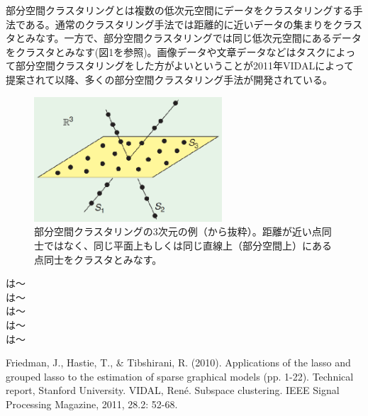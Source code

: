 部分空間クラスタリングとは複数の低次元空間にデータをクラスタリングする手法である。通常のクラスタリング手法では距離的に近いデータの集まりをクラスタとみなす。一方で、部分空間クラスタリングでは同じ低次元空間にあるデータをクラスタとみなす(図1を参照)。画像データや文章データなどはタスクによって部分空間クラスタリングをした方がよいということが2011年VIDAL\cite{SC}によって提案されて以降、多くの部分空間クラスタリング手法が開発されている。

\begin{figure}[h]
    \centering
    \includegraphics[width=7cm]{Matsushima/sc.eps}
    \caption{部分空間クラスタリングの3次元の例（\cite{SC}から抜粋）。距離が近い点同士ではなく、同じ平面上もしくは同じ直線上（部分空間上）にある点同士をクラスタとみなす。}
    \label{fig:my_label}
\end{figure}
\cite{HSM01}は〜\\
\cite{HSM02}は〜\\
\cite{KM01}は〜\\
\cite{KM02}は〜\\
\cite{NM01}は〜

\begin{thebibliography}{9}
    Friedman, J., Hastie, T., & Tibshirani, R. (2010). 
    Applications of the lasso and grouped lasso to the estimation of sparse graphical models (pp. 1-22). Technical report, Stanford University.
 VIDAL, René. Subspace clustering. IEEE Signal Processing Magazine, 2011, 28.2: 52-68.
\end{thebibliography}

